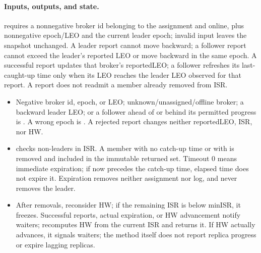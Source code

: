 \paragraph{Inputs, outputs, and state.} requires a nonnegative broker id belonging to the assignment and online, plus nonnegative epoch/LEO and the current leader epoch; invalid input leaves the snapshot unchanged. A leader report cannot move backward; a follower report cannot exceed the leader's reported LEO or move backward in the same epoch. A successful report updates that broker's reportedLEO; a follower refreshes its last-caught-up time only when its LEO reaches the leader LEO observed for that report. A report does not readmit a member already removed from ISR.
\begin{itemize}
\item Negative broker id, epoch, or LEO; unknown/unassigned/offline broker; a backward leader LEO; or a follower ahead of or behind its permitted progress is . A wrong epoch is . A rejected report changes neither reportedLEO, ISR, nor HW.
\item {} checks non-leaders in ISR. A member with no catch-up time or with  is removed and included in the immutable returned set. Timeout 0 means immediate expiration; if now precedes the catch-up time, elapsed time does not expire it. Expiration removes neither assignment nor log, and never removes the leader.
\item After removals, reconsider HW; if the remaining ISR is below minISR, it freezes. Successful reports, actual expiration, or HW advancement notify waiters;  recomputes HW from the current ISR and returns it. If HW actually advances, it signals waiters; the method itself does not report replica progress or expire lagging replicas.
\end{itemize}
